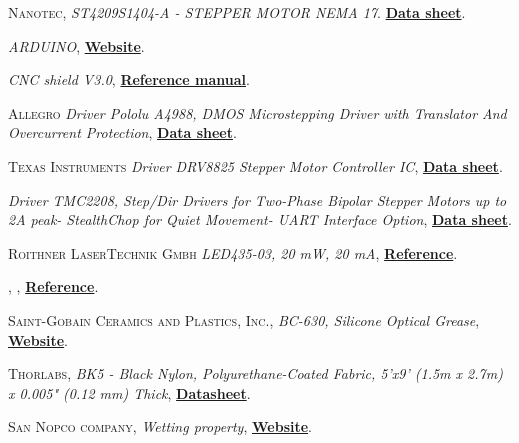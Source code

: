 \begin{thebibliography}{100}
 \textsc{Nanotec},
\textit{ST4209S1404-A - STEPPER MOTOR NEMA 17}. \href{https://en.nanotec.com/products/463-st4209s1404-a}{\textbf{Data sheet}}.

\textit{ARDUINO}, \href{https://www.arduino.cc/}{\textbf{Website}}.

\textit{CNC shield V3.0}, \href{https://osoyoo.com/2017/04/07/arduino-uno-cnc-shield-v3-0-a4988/}{\textbf{Reference manual}}.

 \textsc{Allegro}
\textit{Driver Pololu A4988, DMOS Microstepping Driver with Translator And Overcurrent Protection}, \href{https://www.alldatasheet.es/datasheet-pdf/pdf/455036/ALLEGRO/A4988.html}{\textbf{Data sheet}}.

 \textsc{Texas Instruments}
\textit{Driver DRV8825 Stepper Motor Controller IC}, \href{https://www.ti.com/product/DRV8825?utm_source=google&utm_medium=cpc&utm_campaign=asc-null-null-GPN_EN-cpc-pf-google-wwe&utm_content=DRV8825&ds_k=DRV8825+Datasheet&DCM=yes&gclid=EAIaIQobChMIworWtYba7gIVqoFQBh10_QfhEAAYASAAEgLPn_D_BwE&gclsrc=aw.ds}{\textbf{Data sheet}}.

\textit{Driver TMC2208, Step/Dir Drivers for Two-Phase Bipolar Stepper Motors up to 2A peak- StealthChop for Quiet Movement- UART Interface Option}, \href{https://datasheetspdf.com/pdf/1142008/TRINAMIC/TMC2225/1}{\textbf{Data sheet}}.

 \textsc{Roithner LaserTechnik Gmbh}
\textit{LED435-03, 20 mW, 20 mA}, \href{http://www.roithner-laser.com/led_diverse.html}{\textbf{Reference}}.

 \textsc{},
\textit{}, \href{}{\textbf{Reference}}.

 \textsc{Saint-Gobain Ceramics and Plastics, Inc.},
\textit{BC-630, Silicone Optical Grease}, \href{https://www.crystals.saint-gobain.com/}{\textbf{Website}}.

 \textsc{Thorlabs},
\textit{BK5 - Black Nylon, Polyurethane-Coated Fabric, 5'x9' (1.5m x 2.7m) x 0.005" (0.12 mm) Thick}, \href{https://www.thorlabs.com/thorproduct.cfm?partnumber=BK5}{\textbf{Datasheet}}.

 \textsc{San Nopco company},
\textit{Wetting property}, \href{https://www.sannopco.co.jp/eng/products/function/function4.php}{\textbf{Website}}.


\end{thebibliography}
